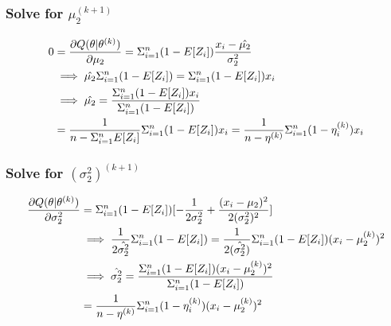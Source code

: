 \documentclass[]{article}
\begin{document}
\subsubsection{\texorpdfstring{Solve for
\(\mu_2^{(k + 1)}\)}{Solve for \textbackslash{}mu\_2\^{}\{(k + 1)\}}}\label{solve-for-mu_2k-1}

\begin{align*}
0 &= \frac{\partial Q(\theta | \theta^{(k)})}{\partial \mu_2} = \Sigma_{i=1}^{n} (1 - E[Z_i]) \frac{x_i - \hat{\mu_2}}{\sigma_2^2} \\
&\implies \hat{\mu_2} \Sigma_{i=1}^{n} (1 - E[Z_i]) = \Sigma_{i=1}^{n}(1 - E[Z_i])x_i \\ 
&\implies \hat{\mu_2} = \frac{\Sigma_{i=1}^{n}(1- E[Z_i])x_i}{\Sigma_{i=1}^{n}(1- E[Z_i])} \\ 
&= \frac{1}{n - \Sigma_{i=1}^{n} E[Z_i]} \Sigma_{i=1}^{n}(1 - E[Z_i])x_i = \frac{1}{n - \eta^{(k)}} \Sigma_{i=1}^{n}(1 - \eta_i^{(k)})x_i
\end{align*}

\subsubsection{\texorpdfstring{Solve for
\((\sigma_2^2)^{(k + 1)}\)}{Solve for (\textbackslash{}sigma\_2\^{}2)\^{}\{(k + 1)\}}}\label{solve-for-sigma_22k-1}

\begin{align*}
\frac{\partial Q(\theta | \theta^{(k)})}{\partial \sigma_2^{2}} &= \Sigma_{i=1}^{n}(1 - E[Z_i])[-\frac{1}{2 \sigma_2^2} + \frac{(x_i -\mu_2)^2}{2(\sigma_2^2)^2}] \\
&\implies \frac{1}{2\hat{\sigma_2^2}} \Sigma_{i=1}^{n}(1 - E[Z_i]) = \frac{1}{2(\hat{\sigma_2^2})} \Sigma_{i=1}^{n} (1 - E[Z_i])(x_i - \mu_2^{(k)})^2 \\
&\implies \hat{\sigma_2^2} = \frac{\Sigma_{i=1}^{n} (1 - E[Z_i]) (x_i - \mu_2^{(k)})^2}{\Sigma_{i=1}^{n}(1 - E[Z_i])}  \\
&= \frac{1}{n - \eta^{(k)}} \Sigma_{i=1}^{n} (1 - \eta^{(k)}_i)(x_i - \mu_2^{(k)})^2
\end{align*}
\end{document}
